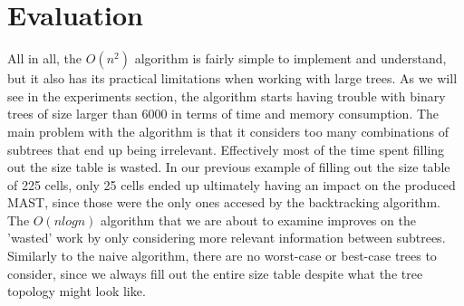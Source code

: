 \section{Evaluation}
All in all, the $O(n^2)$ algorithm is fairly simple to implement and understand, but it also has its practical limitations when working with large trees. As we will see in the experiments section, the algorithm starts having trouble with binary trees of size larger than 6000 in terms of time and memory consumption. The main problem with the algorithm is that it considers too many combinations of subtrees that end up being irrelevant. Effectively most of the time spent filling out the size table is wasted. In our previous example of filling out the size table of 225 cells, only 25 cells ended up ultimately having an impact on the produced MAST, since those were the only ones accesed by the backtracking algorithm. The $O(nlogn)$ algorithm that we are about to examine improves on the 'wasted' work by only considering more relevant information between subtrees.
Similarly to the naive algorithm, there are no worst-case or best-case trees to consider, since we always fill out the entire size table despite what the tree topology might look like. 
